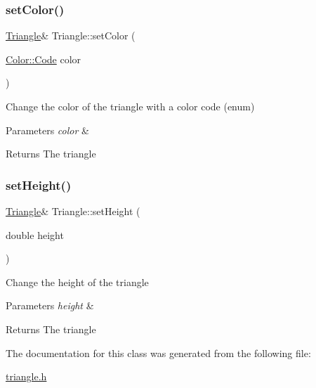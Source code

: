 \subsubsection{\texorpdfstring{set\+Color()}{setColor()}\hspace{0.1cm}{\footnotesize\ttfamily [2/2]}}
{\footnotesize\ttfamily \hyperlink{classTriangle}{Triangle}\& Triangle\+::set\+Color (\begin{DoxyParamCaption}\item[{\hyperlink{classColor_a20a7b04657c1d83fae5d54514d3f1622}{Color\+::\+Code}}]{color }\end{DoxyParamCaption})}

Change the color of the triangle with a color code (enum) 
\begin{DoxyParams}{Parameters}
{\em color} & \\
\hline
\end{DoxyParams}
\begin{DoxyReturn}{Returns}
The triangle 
\end{DoxyReturn}
\mbox{\label{classTriangle_a3620f5aea366eb716b6279f54613257d}} 
\subsubsection{\texorpdfstring{set\+Height()}{setHeight()}}
{\footnotesize\ttfamily \hyperlink{classTriangle}{Triangle}\& Triangle\+::set\+Height (\begin{DoxyParamCaption}\item[{double}]{height }\end{DoxyParamCaption})}

Change the height of the triangle 
\begin{DoxyParams}{Parameters}
{\em height} & \\
\hline
\end{DoxyParams}
\begin{DoxyReturn}{Returns}
The triangle 
\end{DoxyReturn}


The documentation for this class was generated from the following file\+:\begin{DoxyCompactItemize}
\item 
\hyperlink{triangle_8h}{triangle.\+h}\end{DoxyCompactItemize}
